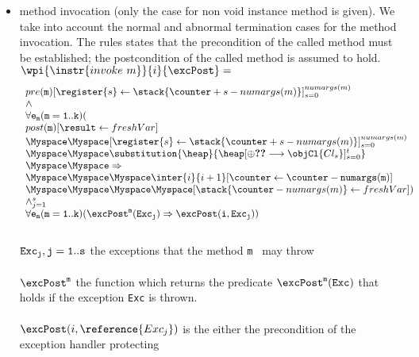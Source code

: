 \begin{itemize}
	 				 	\item method invocation  (only the case for non void instance method is given). We take into account the normal and abnormal termination cases
	 				 	for the method invocation.  The rules states that the precondition of the called method must be established; 
	 				 	the postcondition of the called method is assumed to hold. \\
	 				 			$\wpi{\instr{invoke  \   m}} {i} {\excPost}  =  $ \\
	 				 			$$ 
	 				 			\begin{array}{l}
	 				 			pre( \texttt{m})[ \register{s} \leftarrow \stack{\counter + s - numargs(m)}]_{s = 0}^{numargs(m) }  \\
	 				 			\wedge \\
	 				 			\forall  \tt{e_m} ( m =1 .. k  )(  \\ 
	 				 				post( \texttt{m} )[\result \leftarrow freshVar ]\\
	 				 				\Myspace \Myspace [ \register{s} \leftarrow \stack{\counter + s - numargs(m)}]_{s = 0}^{numargs(m) } \\	 				 						\Myspace  \Myspace  \substitution{\heap}{\heap[\oplus \Ref{Cl_s } \longrightarrow \objCl{Cl_s}]_{s=0}^t}\\
	 				 					 \Myspace \Myspace \Rightarrow \\  
	 				 					\Myspace \Myspace \Myspace  \inter{i}{i+1 } [\counter \leftarrow \counter -  \tt{numargs(m)}   ] \\ 
										\Myspace \Myspace \Myspace \Myspace   [  \stack{\counter -  numargs(m)   } \leftarrow freshVar ]																																										
	 				 			) \\
	 				 			\wedge_{j = 1}^s \\
	 				 			\forall \tt{e_m} ( m =1 .. k  ) ( \excPost^{\texttt{m}}( \tt{Exc_j} ) \Rightarrow   \excPost(i,\tt{Exc_j})  ) \\		
	 				 			\end{array}
	 				 			$$ \\
	 				 		$ \tt{Exc_j} , j = 1 .. s$ the exceptions that the method \texttt{m } may throw \\ \\
	 				 		$	\excPost^{\tt{m} }$ the function which returns the predicate $	\excPost^{\tt{m} }(\tt{Exc})$ that holds
	 				 		if the exception \texttt{Exc} is thrown.\\  \\
							$ \excPost( i, \reference{Exc_j}) $ is the either the precondition of the exception handler protecting

\end{itemize}
